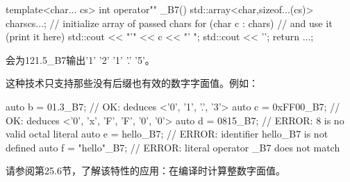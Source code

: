 \begin{cpp}
template<char... cs>
int operator"" _B7() {
	std::array<char,sizeof...(cs)> chars{cs...}; // initialize array of passed chars
	for (char c : chars) { // and use it (print it here)
		std::cout << "'" << c << "' ";
	}
	std::cout << '\n';
	return ...;
}
\end{cpp}

会为121.5\_B7输出'1' '2' '1' '.' '5'。

这种技术只支持那些没有后缀也有效的数字字面值。例如：

\begin{cpp}
auto b = 01.3_B7; // OK: deduces <'0', '1', '.', '3'>
auto c = 0xFF00_B7; // OK: deduces <'0', 'x', 'F', 'F', '0', '0'>
auto d = 0815_B7; // ERROR: 8 is no valid octal literal
auto e = hello_B7; // ERROR: identifier hello_B7 is not defined
auto f = "hello"_B7; // ERROR: literal operator _B7 does not match
\end{cpp}

请参阅第25.6节，了解该特性的应用：在编译时计算整数字面值。






















